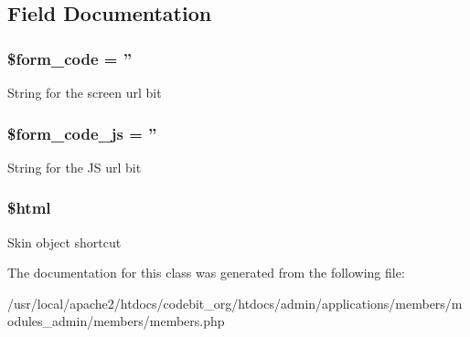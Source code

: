 \subsection{Field Documentation}
\hypertarget{classadmin__members__members__members_af28aee726fa3eb6c355d08a2ab655e03}{
\subsubsection[{\$form\-\_\-code}]{\setlength{\rightskip}{0pt plus 5cm}\$form\-\_\-code = ''}}\label{classadmin__members__members__members_af28aee726fa3eb6c355d08a2ab655e03}
String for the screen url bit \hypertarget{classadmin__members__members__members_ac68fe8a02a2efd63c3271179f4b4fbb7}{
\subsubsection[{\$form\-\_\-code\-\_\-js}]{\setlength{\rightskip}{0pt plus 5cm}\$form\-\_\-code\-\_\-js = ''}}\label{classadmin__members__members__members_ac68fe8a02a2efd63c3271179f4b4fbb7}
String for the J\-S url bit \hypertarget{classadmin__members__members__members_a6f96e7fc92441776c9d1cd3386663b40}{
\subsubsection[{\$html}]{\setlength{\rightskip}{0pt plus 5cm}\$html}}\label{classadmin__members__members__members_a6f96e7fc92441776c9d1cd3386663b40}
Skin object shortcut 

The documentation for this class was generated from the following file\-:\begin{DoxyCompactItemize}
\item 
/usr/local/apache2/htdocs/codebit\-\_\-org/htdocs/admin/applications/members/modules\-\_\-admin/members/members.\-php\end{DoxyCompactItemize}
